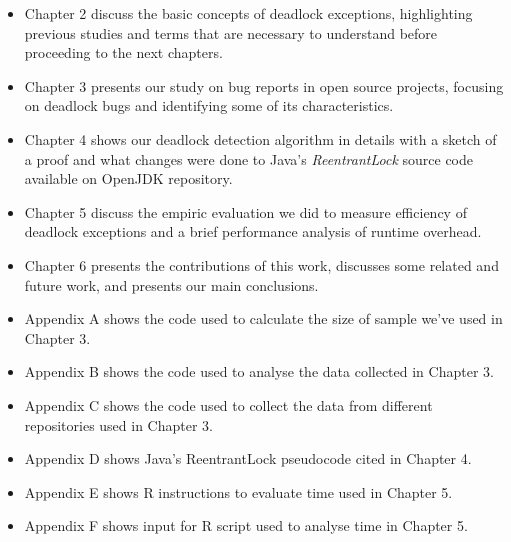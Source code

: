 \begin{itemize}
  \item Chapter 2 discuss the basic concepts of deadlock exceptions, highlighting previous studies and terms that are necessary to understand before proceeding to the next chapters.
  \item Chapter 3 presents our study on bug reports in open source projects, focusing on deadlock bugs and identifying some of its characteristics.
  \item Chapter 4 shows our deadlock detection algorithm in details with a sketch of a proof and what changes were done to Java's \emph{ReentrantLock} source code available on OpenJDK repository.
  \item Chapter 5 discuss the empiric evaluation we did to measure efficiency of deadlock exceptions and a brief performance analysis of runtime overhead.
  \item Chapter 6 presents the contributions of this work, discusses some related and future work, and presents our main conclusions.
  \item Appendix A shows the code used to calculate the size of sample we've used in Chapter 3.
  \item Appendix B shows the code used to analyse the data collected in Chapter 3.
  \item Appendix C shows the code used to collect the data from different repositories used in Chapter 3.
  \item Appendix D shows Java's ReentrantLock pseudocode cited in Chapter 4.
  \item Appendix E shows R instructions to evaluate time used in Chapter 5.
  \item Appendix F shows input for R script used to analyse time in Chapter 5.
\end{itemize}



